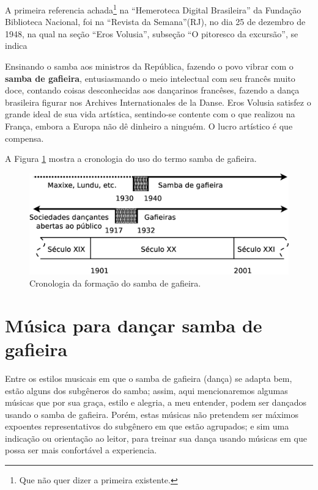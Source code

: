 A primeira referencia achada\footnote{Que não quer dizer a primeira existente.} 
na ``Hemeroteca Digital Brasileira'' da Fundação Biblioteca Nacional,
foi na ``Revista da Semana''(RJ), no dia 25 de dezembro de 1948,
na qual na seção ``Eros Volusia'', subseção ``O pitoresco da excursão'', se indica \cite[pp. 48]{sambagafieirarefbn}
\begin{citando}
Ensinando o samba aos ministros da República, 
fazendo o povo vibrar com o \textbf{samba de gafieira}, entusiasmando
o meio intelectual com seu francês muito doce,
contando coisas desconhecidas aos dançarinos francêses,
fazendo a dança brasileira figurar nos Archives Internationales de la Danse.
Eros Volusia satisfez o grande ideal de sua vida artística, sentindo-se contente
com o que realizou na França, embora a Europa não dê dinheiro a ninguém.
O lucro artístico é que compensa.
\end{citando}


A Figura \ref{fig:sambagafieiracrono} mostra a cronologia do uso do termo samba de gafieira. 

\begin{figure}[h]
  \centering
    \includegraphics[width=1.0\textwidth]{chapters/cap-historia-sambagafieira/gafieira-crono.eps}
  \caption{ Cronologia da formação do samba de gafieira.}
\label{fig:sambagafieiracrono}
\end{figure}

\section{Música para dançar samba de gafieira}
\label{subsec:gafieiradancaestilos}

Entre os estilos musicais em que o samba de gafieira (dança) se adapta bem, 
estão alguns dos subgêneros do samba; assim,
aqui mencionaremos algumas músicas que por sua graça, estilo e alegria,
a meu entender, podem ser dançados usando o samba de gafieira. Porém, 
estas músicas não pretendem ser máximos expoentes representativos do subgênero em que estão agrupados;
e sim uma indicação ou orientação ao leitor, 
para treinar sua dança usando músicas em que possa ser mais confortável a experiencia.


